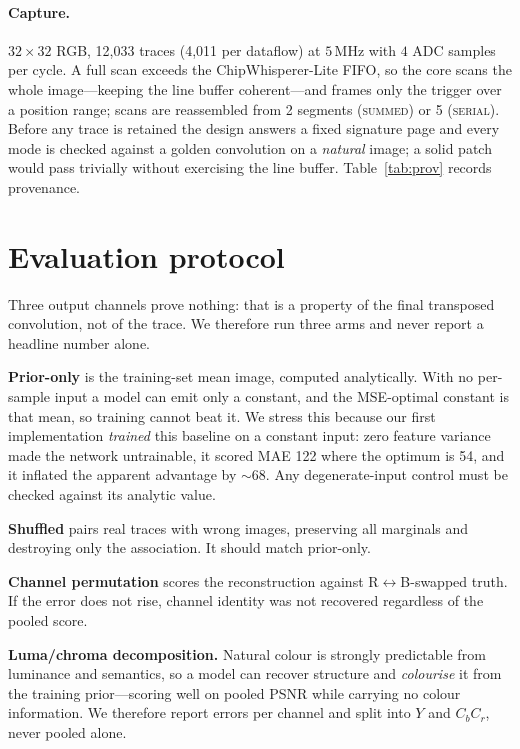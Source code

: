 \documentclass[10pt,conference]{article}
\begin{document}
\paragraph{Capture.} $32\times32$ RGB, 12{,}033 traces (4{,}011 per dataflow) at
$5$\,MHz with $4$ ADC samples per cycle. A full scan exceeds the ChipWhisperer-Lite FIFO,
so the core scans the whole image---keeping the line buffer coherent---and frames only
the trigger over a position range; scans are reassembled from 2 segments
(\textsc{summed}) or 5 (\textsc{serial}). Before any trace is retained the design answers
a fixed signature page and every mode is checked against a golden convolution on a
\emph{natural} image; a solid patch would pass trivially without exercising the line
buffer. Table~\ref{tab:prov} records provenance.

\begin{table}[t]\centering\small
\caption{Capture provenance. Generated from the result JSON.}
\label{tab:prov}

\end{table}

\section{Evaluation protocol}

Three output channels prove nothing: that is a property of the final transposed
convolution, not of the trace. We therefore run three arms and never report a headline
number alone.

\textbf{Prior-only} is the training-set mean image, computed analytically. With no
per-sample input a model can emit only a constant, and the MSE-optimal constant is that
mean, so training cannot beat it. We stress this because our first implementation
\emph{trained} this baseline on a constant input: zero feature variance made the network
untrainable, it scored MAE 122 where the optimum is 54, and it inflated the apparent
advantage by ${\sim}68$. Any degenerate-input control must be checked against its
analytic value.

\textbf{Shuffled} pairs real traces with wrong images, preserving all marginals and
destroying only the association. It should match prior-only.

\textbf{Channel permutation} scores the reconstruction against R$\leftrightarrow$B-swapped
truth. If the error does not rise, channel identity was not recovered regardless of the
pooled score.

\textbf{Luma/chroma decomposition.} Natural colour is strongly predictable from luminance
and semantics, so a model can recover structure and \emph{colourise} it from the training
prior---scoring well on pooled PSNR while carrying no colour information. We therefore
report errors per channel and split into $Y$ and $C_bC_r$, never pooled alone.
\end{document}
